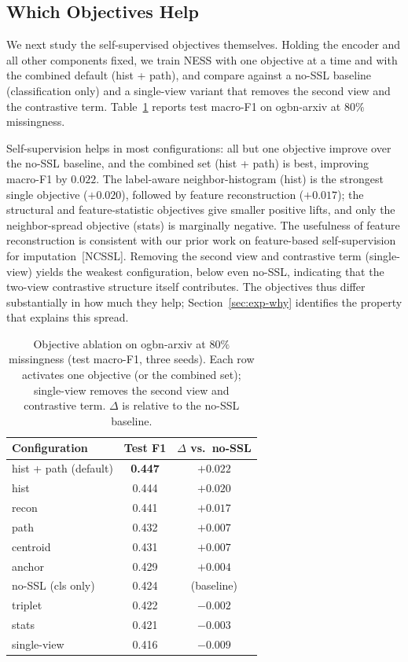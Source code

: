 \subsection{Which Objectives Help}
\label{sec:exp-objectives}

We next study the self-supervised objectives themselves. Holding the encoder and all other components fixed, we train NESS with one objective at a time and with the combined default (hist + path), and compare against a no-SSL baseline (classification only) and a single-view variant that removes the second view and the contrastive term. Table~\ref{tab:objectives} reports test macro-F1 on ogbn-arxiv at $80\%$ missingness.

Self-supervision helps in most configurations: all but one objective improve over the no-SSL baseline, and the combined set (hist + path) is best, improving macro-F1 by $0.022$. The label-aware neighbor-histogram (hist) is the strongest single objective ($+0.020$), followed by feature reconstruction ($+0.017$); the structural and feature-statistic objectives give smaller positive lifts, and only the neighbor-spread objective (stats) is marginally negative. The usefulness of feature reconstruction is consistent with our prior work on feature-based self-supervision for imputation~[NCSSL]. Removing the second view and contrastive term (single-view) yields the weakest configuration, below even no-SSL, indicating that the two-view contrastive structure itself contributes. The objectives thus differ substantially in how much they help; Section~\ref{sec:exp-why} identifies the property that explains this spread.

\begin{table}[t]
\centering
\caption{Objective ablation on ogbn-arxiv at $80\%$ missingness (test macro-F1, three seeds). Each row activates one objective (or the combined set); single-view removes the second view and contrastive term. $\Delta$ is relative to the no-SSL baseline.}
\label{tab:objectives}
\small
\begin{tabular}{@{}lcc@{}}
\toprule
\textbf{Configuration} & \textbf{Test F1} & \textbf{$\Delta$ vs.\ no-SSL} \\
\midrule
hist + path (default) & \textbf{0.447} & $+0.022$ \\
hist                  & 0.444 & $+0.020$ \\
recon                 & 0.441 & $+0.017$ \\
path                  & 0.432 & $+0.007$ \\
centroid              & 0.431 & $+0.007$ \\
anchor                & 0.429 & $+0.004$ \\
no-SSL (cls only)     & 0.424 & (baseline) \\
triplet               & 0.422 & $-0.002$ \\
stats                 & 0.421 & $-0.003$ \\
single-view           & 0.416 & $-0.009$ \\
\bottomrule
\end{tabular}
\end{table}
